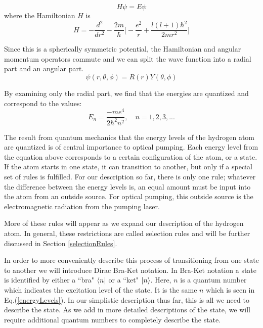 \documentclass[12pt]{article}
\begin{document}
		\begin{equation}
		  H\psi = E\psi
		\end{equation}
		where the Hamiltonian $H$ is 
		\begin{equation}
			H=-\frac{d^2}{dr^2}-\frac{2m}{\hbar}\Big[-\frac{e^2}{r} + \frac{l(l+1)\hbar^2}{2mr^2}\Big]
		\end{equation}
		
		Since this is a spherically
		symmetric potential, the Hamiltonian and angular momentum
		operators commute and we can split the wave function into a
		radial part and an angular part. 
		\begin{equation}
			\psi(r,\theta,\phi)=R(r)Y(\theta,\phi)
		\end{equation}

		By examining only the radial part, we find that the energies
		are quantized and correspond to the values:
		\begin{equation}\label{energyLevelsEq}
			E_n=\frac{-me^4}{2\hbar^2n^2},\quad n=1,2,3,...
		\end{equation}

		The result from quantum mechanics that the energy levels 
		of the hydrogen atom are 
		quantized is of central importance to optical pumping. 
		Each energy level from the equation above 
		corresponds to a certain configuration of the 
		atom, or a state. If the atom starts in one state, it can 
		transition to another, but
		only if a special set of rules is fulfilled. 
        For our description so far, there is only one rule;
		whatever the difference between the energy levels is, 
		an equal amount must be input into the atom from an outside
		source. For optical pumping, this outside source
		is the electromagnetic radiation from the pumping laser.
	
        More of these rules will appear as we
        expand our description of the hydrogen atom.
        In general, these restrictions 
        are called selection rules and will be further
        discussed in 
        Section \ref{selectionRules}.

        In order to more conveniently describe 
        this process of transitioning from one state to another
        we will introduce Dirac Bra-Ket notation. In 
        Bra-Ket notation a state is identified by 
        either a ``bra" $\bra{n}$
        or a ``ket" $\ket{n}$. Here, $n$ is a quantum number
		which indicates the excitation level of the state.
		It is the same $n$ which is seen in Eq.(\ref{energyLevels}). 
		In our simplistic description thus far, 
		this is all we need to describe the state.
		As we add in more detailed descriptions of 
		the state, we will require additional quantum
		numbers to completely 
		describe the state.
\end{document}
